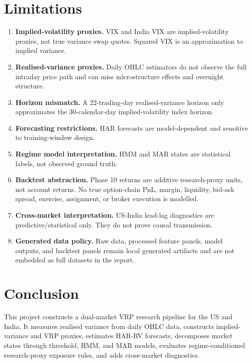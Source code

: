 \documentclass[11pt,a4paper]{article}
\begin{document}
\section{Limitations}

\begin{enumerate}
    \item \textbf{Implied-volatility proxies.} VIX and India VIX are implied-volatility proxies, not true variance swap quotes. Squared VIX is an approximation to implied variance.
    \item \textbf{Realised-variance proxies.} Daily OHLC estimators do not observe the full intraday price path and can miss microstructure effects and overnight structure.
    \item \textbf{Horizon mismatch.} A 22-trading-day realised-variance horizon only approximates the 30-calendar-day implied-volatility index horizon.
    \item \textbf{Forecasting restrictions.} HAR forecasts are model-dependent and sensitive to training-window design.
    \item \textbf{Regime model interpretation.} HMM and MAR states are statistical labels, not observed ground truth.
    \item \textbf{Backtest abstraction.} Phase 10 returns are additive research-proxy units, not account returns. No true option-chain PnL, margin, liquidity, bid-ask spread, exercise, assignment, or broker execution is modelled.
    \item \textbf{Cross-market interpretation.} US-India lead-lag diagnostics are predictive/statistical only. They do not prove causal transmission.
    \item \textbf{Generated data policy.} Raw data, processed feature panels, model outputs, and backtest panels remain local generated artifacts and are not embedded as full datasets in the report.
\end{enumerate}

\section{Conclusion}

This project constructs a dual-market VRP research pipeline for the US and India. It measures realised variance from daily OHLC data, constructs implied-variance and VRP proxies, estimates HAR-RV forecasts, decomposes market states through threshold, HMM, and MAR models, evaluates regime-conditioned research-proxy exposure rules, and adds cross-market diagnostics.
\end{document}
